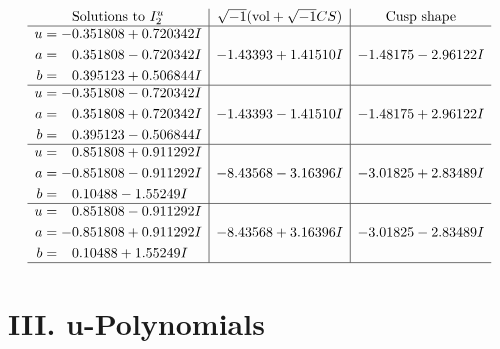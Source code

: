 \documentclass[1p]{elsarticle_modified}
\theoremstyle{definition}
\newcommand{\I}{\sqrt{-1}}
\begin{document}
$$\begin{array}{c|c|c}  
\text{Solutions to }I^u_{2}& \I (\text{vol} + \sqrt{-1}CS) & \text{Cusp shape}\\
 \hline 
\begin{aligned}
u &= -0.351808 + 0.720342 I \\
a &= \phantom{-}0.351808 - 0.720342 I \\
b &= \phantom{-}0.395123 + 0.506844 I\end{aligned}
 & -1.43393 + 1.41510 I & -1.48175 - 2.96122 I \\ \hline\begin{aligned}
u &= -0.351808 - 0.720342 I \\
a &= \phantom{-}0.351808 + 0.720342 I \\
b &= \phantom{-}0.395123 - 0.506844 I\end{aligned}
 & -1.43393 - 1.41510 I & -1.48175 + 2.96122 I \\ \hline\begin{aligned}
u &= \phantom{-}0.851808 + 0.911292 I \\
a &= -0.851808 - 0.911292 I \\
b &= \phantom{-}0.10488 - 1.55249 I\end{aligned}
 & -8.43568 - 3.16396 I & -3.01825 + 2.83489 I \\ \hline\begin{aligned}
u &= \phantom{-}0.851808 - 0.911292 I \\
a &= -0.851808 + 0.911292 I \\
b &= \phantom{-}0.10488 + 1.55249 I\end{aligned}
 & -8.43568 + 3.16396 I & -3.01825 - 2.83489 I\\
 \hline 
 \end{array}$$\newpage
\newpage\renewcommand{\arraystretch}{1}
\centering \section*{ III. u-Polynomials}
\end{document}
